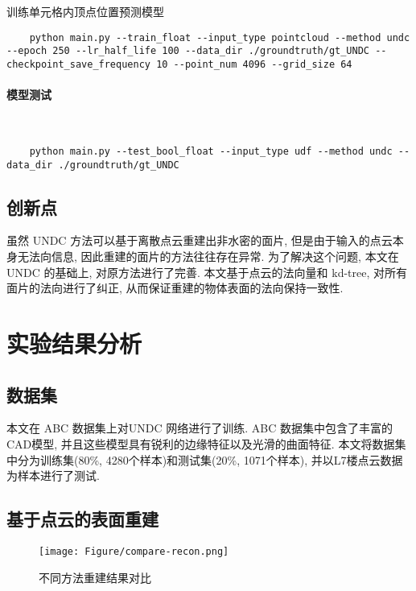 训练单元格内顶点位置预测模型

\lstset{language=bash}
\begin{lstlisting}
    python main.py --train_float --input_type pointcloud --method undc --epoch 250 --lr_half_life 100 --data_dir ./groundtruth/gt_UNDC --checkpoint_save_frequency 10 --point_num 4096 --grid_size 64
\end{lstlisting}

\paragraph{模型测试}~{}

\lstset{language=bash}
\begin{lstlisting}
    python main.py --test_bool_float --input_type udf --method undc --data_dir ./groundtruth/gt_UNDC
\end{lstlisting}

\subsection{创新点}

虽然 UNDC 方法可以基于离散点云重建出非水密的面片, 但是由于输入的点云本身无法向信息, 因此重建的面片的方法往往存在异常. 
为了解决这个问题, 本文在 UNDC 的基础上, 对原方法进行了完善. 本文基于点云的法向量和 kd-tree, 对所有面片的法向进行了纠正, 从而保证重建的物体表面的法向保持一致性. 

\section{实验结果分析}

\subsection{数据集}

本文在 ABC 数据集上对UNDC 网络进行了训练. ABC 数据集中包含了丰富的CAD模型, 并且这些模型具有锐利的边缘特征以及光滑的曲面特征. 
本文将数据集中分为训练集(80\%, 4280个样本)和测试集(20\%, 1071个样本), 并以L7楼点云数据为样本进行了测试. 

\subsection{基于点云的表面重建}
\begin{figure}[H]
	\center
	\texttt{[image: Figure/compare-recon.png]}
	\centering
	\caption{不同方法重建结果对比}\label{fig:fig-compare}
\end{figure}

